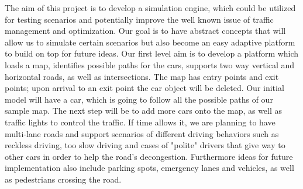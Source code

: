 \documentclass[oneside]{article}
\begin{document}
The aim of this project is to develop a simulation engine, which could be utilized for testing scenarios and potentially improve the well known issue of traffic management and optimization. Our goal is to have abstract concepts that will allow us to simulate certain scenarios but also become an easy adaptive platform to build on top for future ideas. Our first level aim is to develop a platform which loads a map, identifies possible paths for the cars, supports two way vertical and horizontal roads, as well as intersections. The map has entry points and exit points; upon arrival to an exit point the car object will be deleted. Our initial model will have a car, which is going to follow all the possible paths of our sample map. The next step will be to add more cars onto the map, as well as traffic lights to control the traffic. If time allows it, we are planning to have multi-lane roads and support scenarios of different driving behaviors such as reckless driving, too slow driving and cases of "polite" drivers that give way to other cars in order to help the road's decongestion. Furthermore ideas for future implementation also include parking spots, emergency lanes and vehicles, as well as pedestrians crossing the road. 

\end{document}
